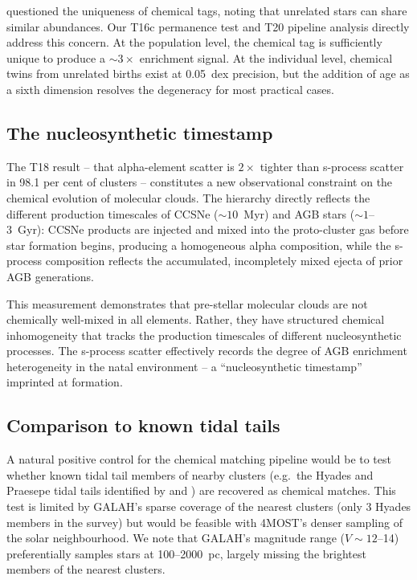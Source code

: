 \documentclass[fleqn,usenatbib]{mnras}
\begin{document}
\citet{Hogg2016} questioned the uniqueness of chemical tags, noting that unrelated stars can share similar abundances.
Our T16c permanence test and T20 pipeline analysis directly address this concern.
At the population level, the chemical tag is sufficiently unique to produce a ${\sim}3\times$ enrichment signal.
At the individual level, chemical twins from unrelated births exist at 0.05~dex precision, but the addition of age as a sixth dimension resolves the degeneracy for most practical cases.

\subsection{The nucleosynthetic timestamp}

The T18 result -- that alpha-element scatter is $2\times$ tighter than s-process scatter in 98.1 per cent of clusters -- constitutes a new observational constraint on the chemical evolution of molecular clouds.
The hierarchy directly reflects the different production timescales of CCSNe (${\sim}10$~Myr) and AGB stars (${\sim}1$--3~Gyr): CCSNe products are injected and mixed into the proto-cluster gas before star formation begins, producing a homogeneous alpha composition, while the s-process composition reflects the accumulated, incompletely mixed ejecta of prior AGB generations.

This measurement demonstrates that pre-stellar molecular clouds are not chemically well-mixed in all elements.
Rather, they have structured chemical inhomogeneity that tracks the production timescales of different nucleosynthetic processes.
The s-process scatter effectively records the degree of AGB enrichment heterogeneity in the natal environment -- a ``nucleosynthetic timestamp'' imprinted at formation.

\subsection{Comparison to known tidal tails}

A natural positive control for the chemical matching pipeline would be to test whether known tidal tail members of nearby clusters (e.g.\ the Hyades and Praesepe tidal tails identified by \citealt{Meingast2019} and \citealt{Jerabkova2021}) are recovered as chemical matches. This test is limited by GALAH's sparse coverage of the nearest clusters (only 3 Hyades members in the survey) but would be feasible with 4MOST's denser sampling of the solar neighbourhood. We note that GALAH's magnitude range ($V \sim 12$--14) preferentially samples stars at 100--2000~pc, largely missing the brightest members of the nearest clusters.
\end{document}

